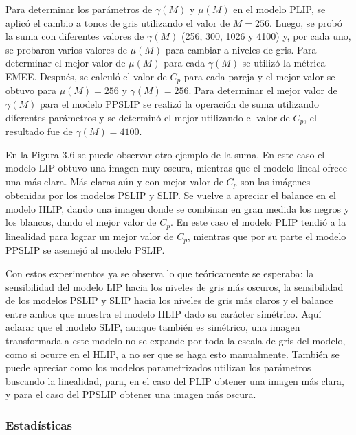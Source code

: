 Para determinar los par\'ametros de $\gamma(M)$ y $\mu(M)$ en el modelo PLIP, se aplic\'o el cambio a tonos de gris utilizando el valor de $M=256$. Luego, se prob\'o la suma con diferentes valores de $\gamma(M)$ (256, 300, 1026 y 4100) y, por cada uno, se probaron varios valores de $\mu(M)$ para cambiar a niveles de gris. Para determinar el mejor valor de $\mu(M)$ para cada $\gamma(M)$ se utiliz\'o la m\'etrica EMEE. Despu\'es, se calcul\'o el valor de $C_p$ para cada pareja y el mejor valor se obtuvo para $\mu(M)=256$ y $\gamma(M)=256$. Para determinar el mejor valor de $\gamma(M)$ para el modelo PPSLIP se realiz\'o la operaci\'on de suma utilizando diferentes par\'ametros y se determin\'o el mejor utilizando el valor de $C_p$, el resultado fue de $\gamma(M)=4100$. 

En la Figura 3.6 se puede observar otro ejemplo de la suma. En este caso el modelo LIP obtuvo una imagen muy oscura, mientras que el modelo lineal ofrece una m\'as clara. M\'as claras a\'un y con mejor valor de $C_p$ son las im\'agenes obtenidas por los modelos PSLIP y SLIP. Se vuelve a apreciar el balance en el modelo HLIP, dando una imagen donde se combinan en gran medida los negros y los blancos, dando el mejor valor de $C_p$. En este caso el modelo PLIP tendi\'o a la linealidad para lograr un mejor valor de $C_p$, mientras que por su parte el modelo PPSLIP se asemej\'o al modelo PSLIP.

Con estos experimentos ya se observa lo que te\'oricamente se esperaba: la sensibilidad del modelo LIP hacia los niveles de gris m\'as oscuros, la sensibilidad de los modelos PSLIP y SLIP hacia los niveles de gris m\'as claros y el balance entre ambos que muestra el modelo HLIP dado su car\'acter sim\'etrico. Aqu\'i aclarar que el modelo SLIP, aunque tambi\'en es sim\'etrico, una imagen transformada a este modelo no se expande por toda la escala de gris del modelo, como si ocurre en el HLIP, a no ser que se haga esto manualmente. Tambi\'en se puede apreciar como los modelos parametrizados utilizan los par\'ametros buscando la linealidad, para, en el caso del PLIP obtener una imagen m\'as clara, y para el caso del PPSLIP obtener una imagen m\'as oscura. 

\subsubsection{Estad\'isticas}

